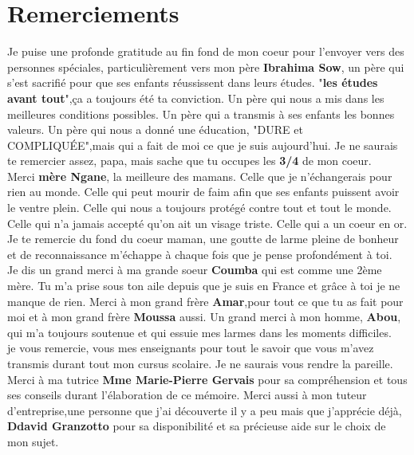 \documentclass[12pt]{report}
\begin{document}
\newpage
\section{Remerciements}

\hspace{1cm} Je puise une profonde gratitude au fin fond de  mon coeur pour l'envoyer vers des personnes spéciales, particulièrement vers mon père \textbf{Ibrahima Sow}, un père qui s'est sacrifié pour que ses enfants réussissent dans leurs études. "\textbf{les études avant tout}",ça a toujours été ta conviction. Un père qui nous a mis dans les meilleures conditions possibles. Un père qui a transmis à ses enfants les bonnes valeurs. Un père qui nous a donné une éducation, "DURE et COMPLIQUÉE",mais qui a fait de moi ce que je suis aujourd'hui. Je ne saurais te remercier assez, papa, mais sache que tu occupes les \textbf{3/4} de mon coeur.\\

\hspace{1cm} Merci \textbf{mère Ngane}, la meilleure des mamans. Celle que je n'échangerais pour rien au monde. Celle qui peut mourir de faim afin que ses enfants puissent avoir le ventre plein. Celle qui nous a toujours protégé contre tout et tout le monde. Celle qui n'a jamais accepté qu'on ait un visage triste. Celle qui a un coeur en or. Je te remercie du fond du coeur maman, une goutte de larme pleine de bonheur et de reconnaissance m'échappe à chaque fois que je pense profondément à toi.\\

\hspace{1cm} Je dis un grand merci à ma grande soeur \textbf{Coumba} qui est comme une 2ème mère. Tu m'a prise sous ton aile depuis que je suis en France et grâce à toi je ne manque de rien. Merci à mon grand frère \textbf{Amar},pour tout ce que tu as fait pour moi et à mon grand frère \textbf{Moussa} aussi. Un grand merci à mon homme, \textbf{Abou}, qui m'a toujours soutenue et qui essuie mes larmes dans les moments difficiles.\\

\hspace{1cm} je vous remercie, vous mes enseignants pour tout le savoir que vous m'avez transmis durant tout mon cursus scolaire. Je ne saurais vous rendre la pareille. Merci à ma tutrice \textbf{Mme  Marie-Pierre Gervais} pour sa compréhension et tous ses conseils durant l'élaboration de ce mémoire. Merci aussi à mon tuteur d'entreprise,une personne que j'ai découverte il y a peu mais que j'apprécie déjà, \textbf{Ddavid Granzotto} pour sa disponibilité et sa précieuse aide sur le choix de mon sujet.\\ 
\end{document}
